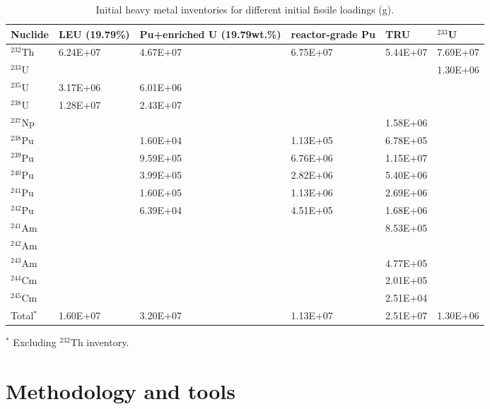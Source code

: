 \begin{table}  %
	\caption{Initial heavy metal inventories for 
	different initial fissile loadings (g).}
	\vspace{0.1in}
	\begin{tabularx}{\textwidth}{X X p{} 
	p{} X X}
		\hline
		Nuclide & \gls{LEU} (19.79\%) & Pu+enriched U (19.79wt.\%) &  
		reactor-grade Pu & \gls{TRU}& $^{233}$U \\	\hline
		$^{232}$Th       &6.24E+07 & 4.67E+07 &   6.75E+07			& 5.44E+07	& 7.69E+07    \\ 
		$^{233}$U        &         & &        &       &  1.30E+06 \\
		$^{235}$U        & 3.17E+06 &6.01E+06	&            &   & \\
		$^{238}$U      	 &1.28E+07  &2.43E+07 &	&  &\\
		$^{237}$Np	  	 &         && &1.58E+06	&    \\
		$^{238}$Pu	  	 &         &1.60E+04	& 1.13E+05 & 6.78E+05	&   \\
		$^{239}$Pu       &         &9.59E+05&6.76E+06& 1.15E+07&    \\
		$^{240}$Pu       &         &3.99E+05& 2.82E+06&5.40E+06&  	\\  
		$^{241}$Pu		 &         &1.60E+05&1.13E+06&2.69E+06&   \\
		$^{242}$Pu		 &         &6.39E+04	&4.51E+05	& 1.68E+06& \\
		$^{241}$Am		 &         &&& 8.53E+05 & \\
		$^{242}$Am		 &         &&&  &\\
		$^{243}$Am       &        & &&4.77E+05&\\
		$^{244}$Cm		 &        & &&2.01E+05&  \\
		$^{245}$Cm		 &        & &&			2.51E+04	&   \\ \hline
		Total$^{\ast}$           & 1.60E+07& 3.20E+07&1.13E+07&  2.51E+07&   1.30E+06  
		\\
		\hline
	\end{tabularx}
\begin{tablenotes}
	\small
	\item $^{\ast}$ Excluding $^{232}$Th inventory.
\end{tablenotes}
\label{tab:table5}
\end{table}


\section{Methodology and tools} \label{Methodology-and-tools}

